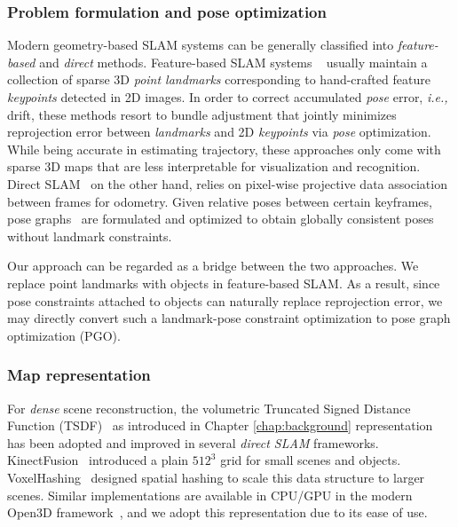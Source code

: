 \subsubsection{Problem formulation and pose optimization}
Modern geometry-based SLAM systems can be generally classified into \textit{feature-based} and \textit{direct} methods.
%
Feature-based SLAM systems ~\cite{mur-artalORBSLAM2OpenSourceSLAM2017, kleinParallelTrackingMapping2007} usually maintain a collection of sparse 3D \textit{point landmarks} corresponding to hand-crafted feature \textit{keypoints} detected in 2D images. In order to correct accumulated \textit{pose} error, \textit{i.e.,} drift, these methods resort to bundle adjustment \cite{triggsBundleAdjustmentModern2000} that jointly minimizes reprojection error between \textit{landmarks} and 2D \textit{keypoints} via \textit{pose} optimization. While being accurate in estimating trajectory, these approaches only come with sparse 3D maps that are less interpretable for visualization and recognition.
%
Direct SLAM~\cite{engelLSDSLAMLargeScaleDirect, engelDirectSparseOdometry2018} on the other hand, relies on pixel-wise projective data association between frames for odometry. Given relative poses between certain keyframes, pose graphs~\cite{dellaertFactorGraphsRobot2017} are formulated and optimized to obtain globally consistent poses without landmark constraints.

Our approach can be regarded as a bridge between the two approaches. We replace point landmarks with objects in feature-based SLAM. As a result, since pose constraints attached to objects can naturally replace reprojection error, we may directly convert such a landmark-pose constraint optimization to pose graph optimization (PGO).

\subsubsection{Map representation}
For \textit{dense} scene reconstruction, the volumetric Truncated Signed Distance Function (TSDF)~\cite{curlessVolumetricMethodBuilding1996} as introduced in Chapter \ref{chap:background} representation has been adopted and improved in several \textit{direct SLAM} frameworks. KinectFusion~\cite{newcombeKinectFusionRealtimeDense2011} introduced a plain $512^3$ grid for small scenes and objects. VoxelHashing~\cite{niessnerRealtime3DReconstruction2013} designed spatial hashing to scale this data structure to larger scenes. Similar implementations are available in CPU/GPU in the modern Open3D framework~\cite{zhouOpen3DModernLibrary2018, dongGPUAcceleratedRobust2019}, and we adopt this representation due to its ease of use.

